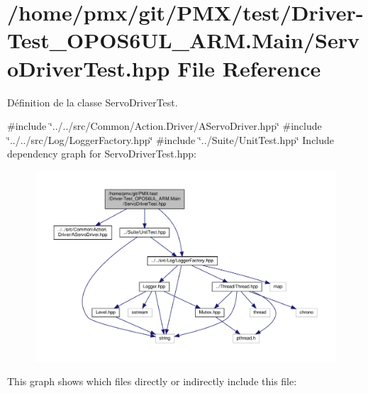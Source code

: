 \hypertarget{Driver-Test__OPOS6UL__ARM_8Main_2ServoDriverTest_8hpp}{}\section{/home/pmx/git/\+P\+M\+X/test/\+Driver-\/\+Test\+\_\+\+O\+P\+O\+S6\+U\+L\+\_\+\+A\+RM.Main/\+Servo\+Driver\+Test.hpp File Reference}
\label{Driver-Test__OPOS6UL__ARM_8Main_2ServoDriverTest_8hpp}


Définition de la classe Servo\+Driver\+Test.  


{\ttfamily \#include \char`\"{}../../src/\+Common/\+Action.\+Driver/\+A\+Servo\+Driver.\+hpp\char`\"{}}\newline
{\ttfamily \#include \char`\"{}../../src/\+Log/\+Logger\+Factory.\+hpp\char`\"{}}\newline
{\ttfamily \#include \char`\"{}../\+Suite/\+Unit\+Test.\+hpp\char`\"{}}\newline
Include dependency graph for Servo\+Driver\+Test.\+hpp\+:
\nopagebreak
\begin{figure}[H]
\begin{center}
\leavevmode
\includegraphics[width=350pt]{Driver-Test__OPOS6UL__ARM_8Main_2ServoDriverTest_8hpp__incl}
\end{center}
\end{figure}
This graph shows which files directly or indirectly include this file\+:
\nopagebreak
